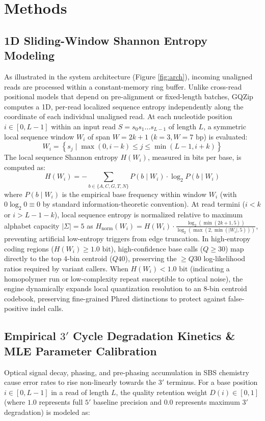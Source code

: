 \documentclass[10pt,twocolumn,a4paper]{article}
\begin{document}
\section{Methods}

\subsection{1D Sliding-Window Shannon Entropy Modeling}
As illustrated in the system architecture (Figure \ref{fig:arch}), incoming unaligned reads are processed within a constant-memory ring buffer. Unlike cross-read positional models that depend on pre-alignment or fixed-length batches, GQZip computes a 1D, per-read localized sequence entropy independently along the coordinate of each individual unaligned read. At each nucleotide position $i \in [0, L-1]$ within an input read $S = s_0 s_1 \dots s_{L-1}$ of length $L$, a symmetric local sequence window $W_i$ of span $W = 2k + 1$ ($k=3, W=7\text{ bp}$) is evaluated:
\begin{equation}
W_i = \left\{ s_j \mid \max(0, i-k) \le j \le \min(L-1, i+k) \right\}
\end{equation}
The local sequence Shannon entropy $H(W_i)$, measured in bits per base, is computed as:
\begin{equation}
H(W_i) = - \sum_{b \in \{A, C, G, T, N\}} P(b \mid W_i) \cdot \log_2 P(b \mid W_i)
\end{equation}
where $P(b \mid W_i)$ is the empirical base frequency within window $W_i$ (with $0 \log_2 0 \equiv 0$ by standard information-theoretic convention). At read termini ($i < k$ or $i > L-1-k$), local sequence entropy is normalized relative to maximum alphabet capacity $|\Sigma|=5$ as $H_{\text{norm}}(W_i) = H(W_i) \cdot \frac{\log_2(\min(2k+1, 5))}{\log_2(\max(2, \min(|W_i|, 5)))}$, preventing artificial low-entropy triggers from edge truncation. In high-entropy coding regions ($H(W_i) \ge 1.0\text{ bit}$), high-confidence base calls ($Q \ge 30$) map directly to the top 4-bin centroid ($Q40$), preserving the $\ge Q30$ log-likelihood ratios required by variant callers. When $H(W_i) < 1.0\text{ bit}$ (indicating a homopolymer run or low-complexity repeat susceptible to optical noise), the engine dynamically expands local quantization resolution to an 8-bin centroid codebook, preserving fine-grained Phred distinctions to protect against false-positive indel calls.

\subsection{Empirical $3'$ Cycle Degradation Kinetics \& MLE Parameter Calibration}
Optical signal decay, phasing, and pre-phasing accumulation in SBS chemistry cause error rates to rise non-linearly towards the $3'$ terminus. For a base position $i \in [0, L-1]$ in a read of length $L$, the quality retention weight $D(i) \in [0, 1]$ (where $1.0$ represents full $5'$ baseline precision and $0.0$ represents maximum $3'$ degradation) is modeled as:
\end{document}
